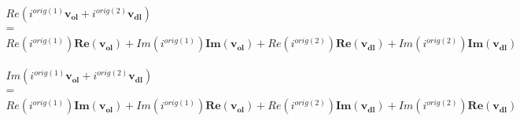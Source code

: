 \documentclass{article}
\begin{document}
\[
    \begin{array}{c}
        Re(i^{orig(1)}\mathbf{v_{ol}} + i^{orig{(2)}}\mathbf{v_{dl}})\\
        =\\
        Re(i^{orig(1)})\mathbf{Re(v_{ol})} + Im(i^{orig(1)})\mathbf{Im(v_{ol})}
        +
        Re(i^{orig(2)})\mathbf{Re(v_{dl})} + Im(i^{orig(2)})\mathbf{Im(v_{dl})}
    \end{array}
\]

\[
    \begin{array}{c}
        Im(i^{orig(1)}\mathbf{v_{ol}} + i^{orig{(2)}}\mathbf{v_{dl}})\\
        =\\
        Re(i^{orig(1)})\mathbf{Im(v_{ol})} + Im(i^{orig(1)})\mathbf{Re(v_{ol})} + Re(i^{orig(2)})\mathbf{Im(v_{dl})} + Im(i^{orig(2)})\mathbf{Re(v_{dl})}

    \end{array}
\]
\end{document}

